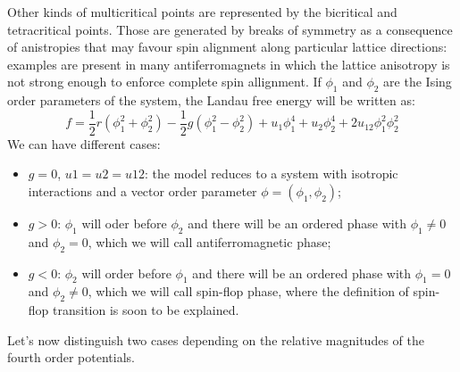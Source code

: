 \documentclass[a4paper,11pt, notitlepage]{report}
\begin{document}
Other kinds of multicritical points are represented by the bicritical and tetracritical points. Those are generated by breaks of symmetry as a consequence of anistropies that may favour spin alignment along particular lattice directions: examples are present in many antiferromagnets in which the lattice anisotropy is not strong enough to enforce complete spin allignment. If $\phi_1$ and $\phi_2$ are the Ising order parameters of the system, the Landau free energy will be written as:
\begin{equation}
f = \frac{1}{2}r(\phi_1^2 + \phi_2^2) - \frac{1}{2}g(\phi_1^2 - \phi_2^2) + u_1\phi_1^4 + u_2\phi_2^4 + 2u_12\phi_1^2\phi_2^2
\end{equation}
We can have different cases:
\begin{itemize}
\item $g=0$, $u1=u2=u12$: the model reduces to a system with isotropic interactions and a vector order parameter $\phi=(\phi_1,\phi_2)$;
\item $g>0$: $\phi_1$ will oder before $\phi_2$ and there will be an ordered phase with $\phi_1 \neq 0$ and $\phi_2 = 0$, which we will call antiferromagnetic phase;
\item $g<0$: $\phi_2$ will order before $\phi_1$ and there will be an ordered phase with $\phi_1 = 0$ and $\phi_2 \neq 0$, which we will call spin-flop phase, where the definition of spin-flop transition is soon to be explained.
\end{itemize}
Let's now distinguish two cases depending on the relative magnitudes of the fourth order potentials.
\end{document}
